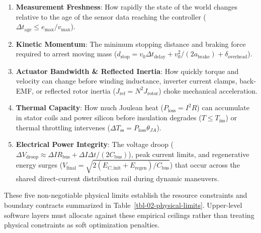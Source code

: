 \documentclass[
  letterpaper,
  DIV=11,
  numbers=noendperiod]{scrartcl}
\providecommand{\tightlist}{%
  \setlength{\itemsep}{0pt}\setlength{\parskip}{0pt}}
\begin{document}
\begin{enumerate}
\def\labelenumi{\arabic{enumi}.}
\tightlist
\item
  \textbf{Measurement Freshness}: How rapidly the state of the world
  changes relative to the age of the sensor data reaching the controller
  (\(\Delta t_{\text{age}} \le e_{\max} / v_{\max}\)).
\item
  \textbf{Kinetic Momentum}: The minimum stopping distance and braking
  force required to arrest moving mass
  (\(d_{\text{stop}} = v_0 \Delta t_{\text{delay}} + v_0^2 / (2 a_{\text{brake}}) + \delta_{\text{overhead}}\)).
\item
  \textbf{Actuator Bandwidth \& Reflected Inertia}: How quickly torque
  and velocity can change before winding inductance, inverter current
  clamps, back-EMF, or reflected rotor inertia
  (\(J_{\text{ref}} = N^2 J_{\text{rotor}}\)) choke mechanical
  acceleration.
\item
  \textbf{Thermal Capacity}: How much Joulean heat
  (\(P_{\text{loss}} = I^2 R\)) can accumulate in stator coils and power
  silicon before insulation degrades (\(T \le T_{\text{ins}}\)) or
  thermal throttling intervenes
  (\(\Delta T_{\text{ss}} = P_{\text{loss}} \theta_{JA}\)).
\item
  \textbf{Electrical Power Integrity}: The voltage droop
  (\(\Delta V_{\text{droop}} \approx \Delta I R_{\text{bus}} + \Delta I \Delta t / (2 C_{\text{bus}})\)),
  peak current limits, and regenerative energy surges
  (\(V_{\text{final}} = \sqrt{2(E_{C,\text{init}} + E_{\text{regen}})/C_{\text{bus}}}\))
  that occur across the shared direct-current distribution rail during
  dynamic maneuvers.
\end{enumerate}

These five non-negotiable physical limits establish the resource
constraints and boundary contracts summarized in
Table~\ref{tbl-02-physical-limits}. Upper-level software layers must
allocate against these empirical ceilings rather than treating physical
constraints as soft optimization penalties.
\end{document}
